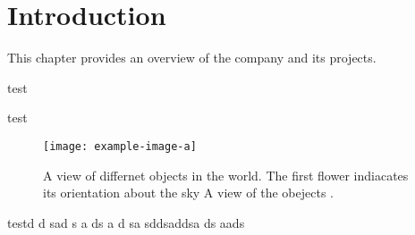 \chapter{Introduction}
This chapter provides an overview of the company and its projects.
\lipsum[2-2]

test

test
\begin{figure}[h]
\texttt{[image: example-image-a]}
\caption[Tu duo titulo debitas latente]{A view of differnet objects in the world. The first flower indiacates its orientation about the sky A view of the obejects .}\label{fig:example}
    \end{figure}
  
    testd d sad s a ds a d sa  sddsaddsa ds aads
